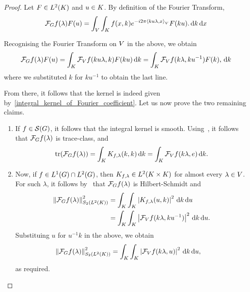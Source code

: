 \begin{proof}
    Let $F \in \Lebesgue{2}\CompactGroup$ and $u \in \CompactGroup$.
    By definition of the Fourier Transform,
    \begin{align*}
        \Fourier f(\lambda) F(u) =
        \int_\VectorSpace
            \int_\CompactGroup
                f(x, k) \e^{-\i \turn \ip{k u \lambda}{x}} F(k u).
            \dd k
        \dd x
    \end{align*}

    Recognising the Fourier Transform on $\VectorSpace$ in the above, we obtain
    \begin{align*}
        \Fourier f(\lambda) F(u) =
        \int_\CompactGroup
            \Fourier[\VectorSpace] f(k u \lambda, k) F(k u)
        \dd k
        =
        \int_\CompactGroup
            \Fourier[\VectorSpace] f(k \lambda, k u^{-1}) F(k),
        \dd k
    \end{align*}
    where we substituted $k$ for $k u^{-1}$ to obtain the last line.

    From there, it follows that the kernel is indeed given by~\eqref{integral_kernel_of_Fourier_coefficient}.
    Let us now prove the two remaining claims.

    \begin{enumerate}
        \item If $f \in \Schwartz\Group$, it follows that the integral kernel is smooth.
            Using~\cite[Corollary 4.1]{DelgadoRuzhansky14}, it follows that $\Fourier f(\lambda)$ is trace-class, and
            \begin{align*}
            \tr(\Fourier f(\lambda))
            = \int_\CompactGroup K_{f, \lambda}(k, k) \dd k
            = \int_\CompactGroup \Fourier[\VectorSpace] f(k \lambda, e) \dd k.
        \end{align*}
    \item Now, if $f \in \Lebesgue{1}\Group \cap \Lebesgue{2}\Group$,
        then $K_{f, \lambda} \in \Lebesgue{2}{\CompactGroup \times \CompactGroup}$ for almost every $\lambda \in \VectorSpace$.
        For such $\lambda$, it follows by~\cite[Theorem VI.23]{Reed72} that $\Fourier f(\lambda)$ is Hilbert-Schmidt and
        \begin{align*}
            \norm[\SchattenClasses{2}{\Lebesgue{2}\CompactGroup}]{\Fourier f(\lambda)}^2
            &= \int_\CompactGroup \int_\CompactGroup \abs{K_{f, \lambda}(u, k)}^2 \dd k \dd u\\
            &= \int_\CompactGroup \int_\CompactGroup \abs{\Fourier[\VectorSpace] f(k \lambda, k u^{-1})}^2 \dd k \dd u.
        \end{align*}
        Substituing $u$ for $u^{-1} k$ in the above, we obtain
        \begin{align*}
            \norm[\SchattenClasses{2}{\Lebesgue{2}\CompactGroup}]{\Fourier f(\lambda)}^2
            &= \int_\CompactGroup \int_\CompactGroup \abs{\Fourier[\VectorSpace] f(k \lambda, u)}^2 \dd k \dd u,
        \end{align*}
        as required.
    \end{enumerate}
\end{proof}

